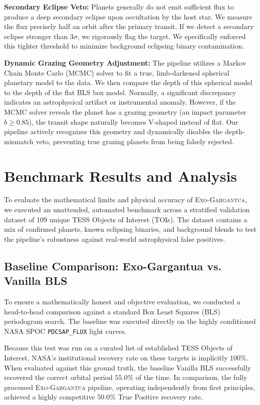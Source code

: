 \documentclass[twocolumn,linenumbers]{aastex701}
\begin{document}
\textbf{Secondary Eclipse Veto:} Planets generally do not emit sufficient flux to produce a deep secondary eclipse upon occultation by the host star. We measure the flux precisely half an orbit after the primary transit. If we detect a secondary eclipse stronger than $3\sigma$, we rigorously flag the target. We specifically enforced this tighter threshold to minimize background eclipsing binary contamination.

\textbf{Dynamic Grazing Geometry Adjustment:} The pipeline utilizes a Markov Chain Monte Carlo (MCMC) solver to fit a true, limb-darkened spherical planetary model to the data. We then compare the depth of this spherical model to the depth of the flat BLS box model. Normally, a significant discrepancy indicates an astrophysical artifact or instrumental anomaly. However, if the MCMC solver reveals the planet has a grazing geometry (an impact parameter $b \ge 0.85$), the transit shape naturally becomes V-shaped instead of flat. Our pipeline actively recognizes this geometry and dynamically disables the depth-mismatch veto, preventing true grazing planets from being falsely rejected.

\section{Benchmark Results and Analysis} \label{sec:benchmarks}

To evaluate the mathematical limits and physical accuracy of \textsc{Exo-Gargantua}, we executed an unattended, automated benchmark across a stratified validation dataset of 109 unique TESS Objects of Interest (TOIs). The dataset contains a mix of confirmed planets, known eclipsing binaries, and background blends to test the pipeline's robustness against real-world astrophysical false positives. 

\subsection{Baseline Comparison: Exo-Gargantua vs. Vanilla BLS}
To ensure a mathematically honest and objective evaluation, we conducted a head-to-head comparison against a standard Box Least Squares (BLS) periodogram search. The baseline was executed directly on the highly conditioned NASA SPOC \texttt{PDCSAP\_FLUX} light curves.

Because this test was run on a curated list of established TESS Objects of Interest, NASA's institutional recovery rate on these targets is implicitly 100\%. When evaluated against this ground truth, the baseline Vanilla BLS successfully recovered the correct orbital period $55.0\%$ of the time. In comparison, the fully processed \textsc{Exo-Gargantua} pipeline, operating independently from first principles, achieved a highly competitive $50.0\%$ True Positive recovery rate. 
\end{document}
